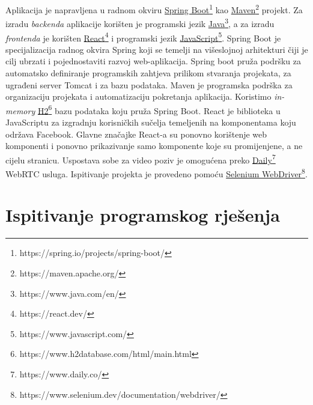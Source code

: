 			\indent Aplikacija je napravljena u radnom okviru \href{https://spring.io/projects/spring-boot/}{Spring Boot\footnote{https://spring.io/projects/spring-boot/}} kao \href{https://maven.apache.org/}{Maven\footnote{https://maven.apache.org/}} projekt. Za izradu \textit{backenda} aplikacije korišten je programski jezik \href{https://www.java.com/en/}{Java\footnote{https://www.java.com/en/}}, a za izradu \textit{frontenda} je korišten \href{https://react.dev/}{React\footnote{https://react.dev/}} i programski jezik \href{https://www.javascript.com/}{JavaScript\footnote{https://www.javascript.com/}}. Spring Boot je specijalizacija radnog okvira Spring koji se temelji na višeslojnoj arhitekturi čiji je cilj ubrzati i pojednostaviti razvoj web-aplikacija. Spring boot pruža podršku za automatsko definiranje programskih zahtjeva prilikom stvaranja projekata, za ugrađeni server Tomcat i za bazu podataka. Maven je programska podrška za organizaciju projekata i automatizaciju pokretanja aplikacija. Koristimo \textit{in-memory} \href{https://www.h2database.com/html/main.html}{H2\footnote{https://www.h2database.com/html/main.html}} bazu podataka koju pruža Spring Boot. React je biblioteka u JavaScriptu za izgradnju korisničkih sučelja temeljenih na komponentama koju održava Facebook. Glavne značajke React-a su ponovno korištenje web komponenti i ponovno prikazivanje samo komponente koje su promijenjene, a ne cijelu stranicu. Uspostava sobe za video poziv je omogućena preko \href{https://www.daily.co/}{Daily\footnote{https://www.daily.co/}} WebRTC usluga. Ispitivanje projekta je provedeno pomoću \href{https://www.selenium.dev/documentation/webdriver/}{Selenium WebDriver\footnote{https://www.selenium.dev/documentation/webdriver/}}.

		\eject 
		
	
		\section{Ispitivanje programskog rješenja}
			
			
	
			
